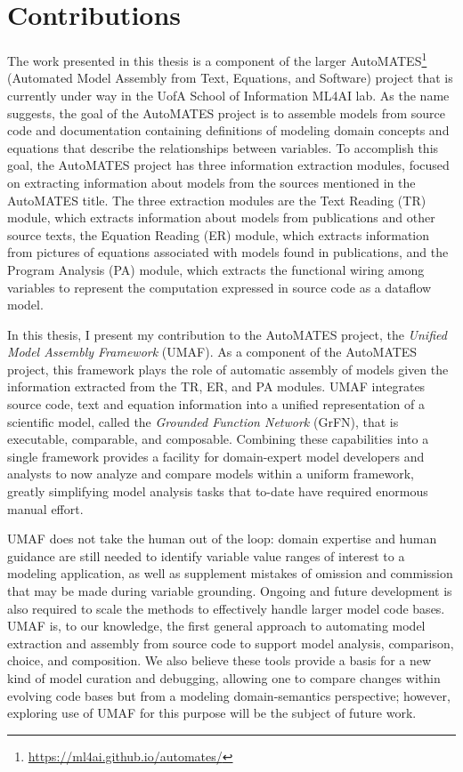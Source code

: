 \section{Contributions\label{sec:contributions}}
The work presented in this thesis is a component of the larger AutoMATES\footnote{\url{https://ml4ai.github.io/automates/}} (Automated Model Assembly from Text, Equations, and Software) project \citep{pyarelal2019} that is currently under way in the UofA School of Information ML4AI lab.
As the name suggests, the goal of the AutoMATES project is to assemble models from source code and documentation containing definitions of modeling domain concepts and equations that describe the relationships between variables.
To accomplish this goal, the AutoMATES project has three information extraction modules, focused on extracting information about models from the sources mentioned in the AutoMATES title.
The three extraction modules are the Text Reading (TR) module, which extracts information about models from publications and other source texts, the Equation Reading (ER) module, which extracts information from pictures of equations associated with models found in publications, and the Program Analysis (PA) module, which extracts the functional wiring among variables to represent the computation expressed in source code as a dataflow model.

In this thesis, I present my contribution to the AutoMATES project, the \emph{Unified Model Assembly Framework} (UMAF).
As a component of the AutoMATES project, this framework plays the role of automatic assembly of models given the information extracted from the TR, ER, and PA modules.
UMAF integrates source code, text and equation information into a unified representation of a scientific model, called the \emph{Grounded Function Network} (GrFN), that is executable, comparable, and composable.
Combining these capabilities into a single framework provides a facility for domain-expert model developers and analysts to now analyze and compare models within a uniform framework, greatly simplifying model analysis tasks that to-date have required enormous manual effort.

UMAF does not take the human out of the loop: domain expertise and human guidance are still needed to identify variable value ranges of interest to a modeling application, as well as supplement mistakes of omission and commission that may be made during variable grounding.
Ongoing and future development is also required to scale the methods to effectively handle larger model code bases.
UMAF is, to our knowledge, the first general approach to automating model extraction and assembly from source code to support model analysis, comparison, choice, and composition.
We also believe these tools provide a basis for a new kind of model curation and debugging, allowing one to compare changes within evolving code bases but from a modeling domain-semantics perspective; however, exploring use of UMAF for this purpose will be the subject of future work.

